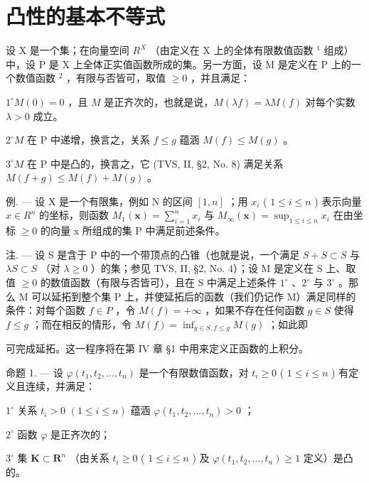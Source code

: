 \section{凸性的基本不等式}

设 X 是一个集；在向量空间 \(R^{X}\) （由定义在 X 上的全体有限数值函数 \(^{1}\) 组成）中，设 P 是 X 上全体正实值函数所成的集。另一方面，设 M 是定义在 P 上的一个数值函数 \(^{2}\) ，有限与否皆可，取值 \(\geqslant0\) ，并且满足：

\(1^{\circ} M(0) = 0\) ，且 \(M\) 是正齐次的，也就是说，\(M(\lambda f) = \lambda M(f)\) 对每个实数 \(\lambda > 0\) 成立。

\(2^{\circ} M\) 在 P 中递增，换言之，关系 \(f \leqslant g\) 蕴涵 \(M(f) \leqslant M(g)\) 。

\(3^{\circ} M\) 在 P 中是凸的，换言之，它 (TVS, II, §2, No. 8) 满足关系 \(M(f + g) \leqslant M(f) + M(g)\) 。

例. --- 设 X 是一个有限集，例如 N 的区间 \([1,n]\) ；用 \(x_{i}\) ( \(1 \leqslant i \leqslant n\) ) 表示向量 \(x \in R^{n}\) 的坐标，则函数 \(M_{1}(\mathbf{x}) = \sum_{i=1}^{n} x_{i}\) 与 \(M_{\infty}(\mathbf{x}) = \sup_{1 \leqslant i \leqslant n} x_{i}\) 在由坐标 \(\geqslant 0\) 的向量 x 所组成的集 P 中满足前述条件。

注. --- 设 S 是含于 P 中的一个带顶点的凸锥（也就是说，一个满足 \(S + S \subset S\) 与 \(\lambda S \subset S\) （对 \(\lambda \geqslant 0\) ）的集；参见 TVS, II, §2, No. 4）；设 M 是定义在 S 上、取值 \(\geqslant 0\) 的数值函数（有限与否皆可），且在 S 中满足上述条件 \(1^{\circ}\) 、\(2^{\circ}\) 与 \(3^{\circ}\) 。那么 M 可以延拓到整个集 P 上，并使延拓后的函数（我们仍记作 M）满足同样的条件：对每个函数 \(f \in P\) ，令 \(M(f) = +\infty\) ，如果不存在任何函数 \(g \in S\) 使得 \(f \leqslant g\) ；而在相反的情形，令 \(M(f) = \inf_{g \in S, f \leqslant g} M(g)\) ；如此即

可完成延拓。这一程序将在第 IV 章 §1 中用来定义正函数的上积分。

命题 1. --- 设 \(\varphi(t_{1}, t_{2}, \ldots, t_{n})\) 是一个有限数值函数，对 \(t_{i} \geqslant 0\) ( \(1 \leqslant i \leqslant n\) ) 有定义且连续，并满足：

\(1^{\circ}\) 关系 \(t_i > 0\) \((1\leqslant i\leqslant n)\) 蕴涵 \(\varphi (t_1,t_2,\dots ,t_n) > 0\) ；

\(2^{\circ}\) 函数 \(\varphi\) 是正齐次的；

\(3^{\circ}\) 集 \(\mathbf{K} \subset \mathbf{R}^{n}\) （由关系 \(t_{i} \geqslant 0\) ( \(1 \leqslant i \leqslant n\) ) 及 \(\varphi(t_{1}, t_{2}, \ldots, t_{n}) \geqslant 1\) 定义）是凸的。

